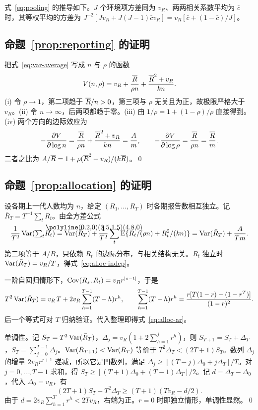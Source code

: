 式~\eqref{eq:pooling} 的推导如下。$J$ 个环境项方差同为 $v_R$、两两相关系数平均为 $\bar c$ 时，其等权平均的方差为 $J^{-2}[Jv_R+J(J-1)\bar cv_R]=v_R[\bar c+(1-\bar c)/J]$。

\subsection{\texorpdfstring{命题~\ref{prop:reporting} 的证明}{命题 3 的证明}}

把式~\eqref{eq:var-average} 写成 $n$ 与 $\rho$ 的函数
\begin{equation*}
  V(n,\rho)=v_R+\frac{\overline{R}}{\rho n}+\frac{\overline{R}^2+v_R}{kn}.
\end{equation*}
(i) 令 $\rho\to1$，第二项趋于 $\overline{R}/n>0$，第三项与 $\rho$ 无关且为正，故极限严格大于 $v_R$。(ii) 令 $n\to\infty$，后两项都趋于零。(iii) 由 $1/\rho=1+(1-\rho)/\rho$ 直接得到。(iv) 两个方向的边际效应为
\begin{equation*}
  -\frac{\partial V}{\partial\log n}=\frac{\overline{R}}{\rho n}+\frac{\overline{R}^2+v_R}{kn}=\frac{A}{m},\qquad
  -\frac{\partial V}{\partial\log\rho}=\frac{\overline{R}}{\rho n}=\frac{\overline{R}}{m}.
\end{equation*}
二者之比为 $A/\overline{R}=1+\rho(\overline{R}^2+v_R)/(k\overline{R})$。\qed

\subsection{\texorpdfstring{命题~\ref{prop:allocation} 的证明}{命题 4 的证明}}

设各期上一代人数均为 $n$，给定 $(R_1,\dots,R_T)$ 时各期报告数相互独立。记 $\bar R_T=T^{-1}\sum_tR_t$。由全方差公式
\begin{equation*}
  \frac{1}{T^2}\Var({\textstyle\sum_t}\widehat R_t)=\Var(\bar R_T)+\frac1{T^2}\sum_t\E\{R_t/(\rho n)+R_t^2/(kn)\}
  =\Var(\bar R_T)+\frac{A}{Tm}.
\end{equation*}
第二项等于 $A/B$，只依赖 $R_t$ 的边际分布，与相关结构无关。$R_t$ 独立时 $\operatorname{Var}(\bar R_T)=v_R/T$，得式~\eqref{eq:alloc-indep}。

一阶自回归情形下，$\operatorname{Cov}(R_s,R_t)=v_Rr^{|s-t|}$，于是
\begin{equation*}
  T^2\operatorname{Var}(\bar R_T)=v_R\,T+2v_R\sum_{h=1}^{T-1}(T-h)r^h,\qquad
  \sum_{h=1}^{T-1}(T-h)r^h=\frac{r[T(1-r)-(1-r^T)]}{(1-r)^2}.
\end{equation*}
后一个等式可对 $T$ 归纳验证。代入整理即得式~\eqref{eq:alloc-ar}。

单调性。记 $S_T=T^2\operatorname{Var}(\bar R_T)$，$\Delta_j=v_R(1+2\sum_{h=1}^{j}r^h)$，则 $S_{T+1}=S_T+\Delta_T$，$S_T=\sum_{j=0}^{T-1}\Delta_j$。$\operatorname{Var}(\bar R_{T+1})<\operatorname{Var}(\bar R_T)$ 等价于 $T^2\Delta_T<(2T+1)S_T$。数列 $\Delta_j$ 的增量 $2v_Rr^{j+1}$ 递减，所以它是凹数列，满足 $\Delta_j\geq[(T-j)\Delta_0+j\Delta_T]/T$。对 $j=0,\dots,T-1$ 求和，得 $S_T\geq[(T+1)\Delta_0+(T-1)\Delta_T]/2$。记 $d=\Delta_T-\Delta_0$，代入 $\Delta_0=v_R$，有
\begin{equation*}
  (2T+1)S_T-T^2\Delta_T\geq(T+1)(Tv_R-d/2).
\end{equation*}
由于 $d=2v_R\sum_{h=1}^{T}r^h<2Tv_R$，右端为正。$r=0$ 时即独立情形，单调性显然。\qed

